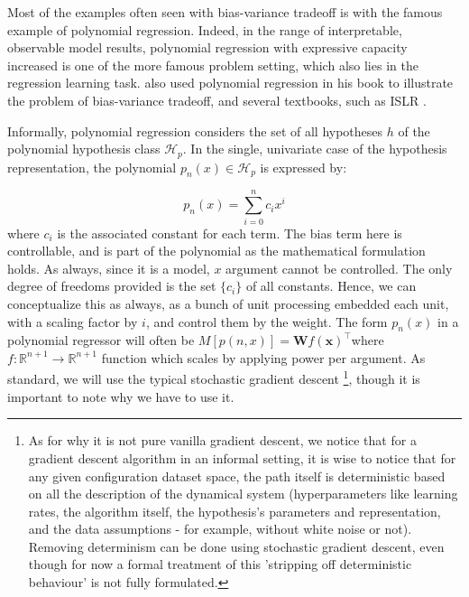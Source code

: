 \documentclass{article}
\begin{document}
Most of the examples often seen with bias-variance tradeoff is with the famous example of polynomial regression. Indeed, in the range of interpretable, observable model results, polynomial regression with expressive capacity increased is one of the more famous problem setting, which also lies in the regression learning task. \cite{goodfellow2016deep} also used polynomial regression in his book to illustrate the problem of bias-variance tradeoff, and several textbooks, such as ISLR \cite{gareth_james_introduction_2013}. 

Informally, polynomial regression considers the set of all hypotheses $h$ of the polynomial hypothesis class $\mathcal{H}_{p}$. In the single, univariate case of the hypothesis representation, the polynomial $p_{n}(x)\in \mathcal{H}_{p}$ is expressed by: 

\begin{equation*}
    p_{n}(x)=\sum^{n}_{i=0}c_{i}x^{i}
\end{equation*}
where $c_{i}$ is the associated constant for each term. The bias term here is controllable, and is part of the polynomial as the mathematical formulation holds. As always, since it is a model, $x$ argument cannot be controlled. The only degree of freedoms provided is the set $\{ c_{i} \}$ of all constants. Hence, we can conceptualize this as always, as a bunch of unit processing embedded each unit, with a scaling factor by $i$, and control them by the weight. The form $p_{n}(x)$ in a polynomial regressor will often be $M[p(n,x)]=\mathbf{W}f(\mathbf{x})^{\top}$where $f:\mathbb{R}^{n+1}\to \mathbb{R}^{n+1}$ function which scales by applying power per argument. As standard, we will use the typical stochastic gradient descent \footnote{As for why it is not pure vanilla gradient descent, we notice that for a gradient descent algorithm in an informal setting, it is wise to notice that for any given configuration dataset space, the path itself is deterministic based on all the description of the dynamical system (hyperparameters like learning rates, the algorithm itself, the hypothesis's parameters and representation, and the data assumptions - for example, without white noise or not). Removing determinism can be done using stochastic gradient descent, even though for now a formal treatment of this 'stripping off deterministic behaviour' is not fully formulated. }, though it is important to note why we have to use it. 
\end{document}
